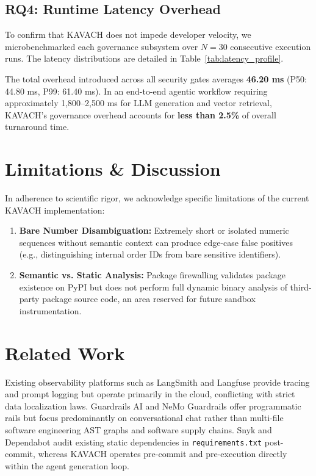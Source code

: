 \documentclass[conference]{IEEEtran}
\begin{document}
\subsection{RQ4: Runtime Latency Overhead}
To confirm that KAVACH does not impede developer velocity, we microbenchmarked each governance subsystem over $N=30$ consecutive execution runs. The latency distributions are detailed in Table~\ref{tab:latency_profile}.



The total overhead introduced across all security gates averages \textbf{46.20 ms} (P50: 44.80 ms, P99: 61.40 ms). In an end-to-end agentic workflow requiring approximately 1,800–2,500 ms for LLM generation and vector retrieval, KAVACH's governance overhead accounts for \textbf{less than 2.5\%} of overall turnaround time.

\section{Limitations \& Discussion}
In adherence to scientific rigor, we acknowledge specific limitations of the current KAVACH implementation:
\begin{enumerate}
    \item \textbf{Bare Number Disambiguation:} Extremely short or isolated numeric sequences without semantic context can produce edge-case false positives (e.g., distinguishing internal order IDs from bare sensitive identifiers).
    \item \textbf{Semantic vs. Static Analysis:} Package firewalling validates package existence on PyPI but does not perform full dynamic binary analysis of third-party package source code, an area reserved for future sandbox instrumentation.
\end{enumerate}

\section{Related Work}
Existing observability platforms such as LangSmith and Langfuse provide tracing and prompt logging but operate primarily in the cloud, conflicting with strict data localization laws. Guardrails AI and NeMo Guardrails offer programmatic rails but focus predominantly on conversational chat rather than multi-file software engineering AST graphs and software supply chains. Snyk and Dependabot audit existing static dependencies in \texttt{requirements.txt} post-commit, whereas KAVACH operates pre-commit and pre-execution directly within the agent generation loop.
\end{document}

